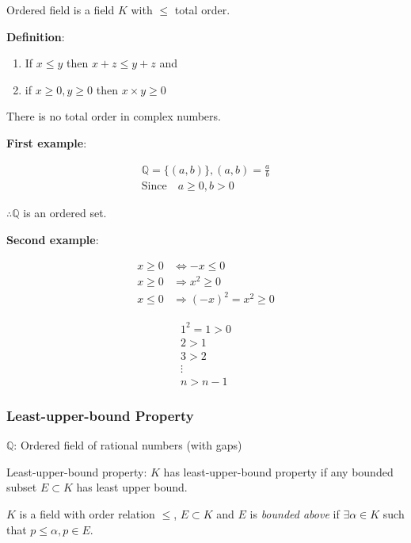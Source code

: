 \documentclass{article}
\begin{document}
    Ordered field is a field $K$ with $\leq$ total order.
    
    \textbf{Definition}:
    
    \begin{enumerate}
        \item If $x \leq y$ then $x + z \leq y + z$ and
        \item if $x \geq 0, y \geq 0$ then $x \times y \geq 0$
    \end{enumerate}

    There is no total order in complex numbers.

    \textbf{First example}:
    
    \begin{gather*}
        \mathbb{Q} = \{ (a, b) \}, (a, b) = \frac{a}{b} \\
        \text{Since} \quad a \geq 0, b > 0
    \end{gather*}
    
    $\therefore \mathbb{Q}$ is an ordered set.
    
    \textbf{Second example}:
    
    \begin{align*}
        x \geq 0 &\Leftrightarrow -x \leq 0 \\
        x \geq 0 &\Rightarrow x^{2} \geq 0 \\
        x \leq 0 &\Rightarrow (-x)^{2} = x^{2} \geq 0
    \end{align*}
    
    \begin{align*}
        1^{2} = 1 > 0 \\
        2 > 1 \\
        3 > 2 \\
        \vdots \\
        n > n - 1
    \end{align*}
    
    \subsubsection{Least-upper-bound Property}
    
    $\mathbb{Q}$: Ordered field of rational numbers (with gaps)
    
    Least-upper-bound property: $K$ has least-upper-bound property if any bounded subset $E \subset K$ has least upper bound.
    
    $K$ is a field with order relation $\leq$, $E \subset K$ and $E$ is \textit{bounded above} if $\exists \alpha \in K$ such that $p \leq \alpha, p \in E$.
    
\end{document}
